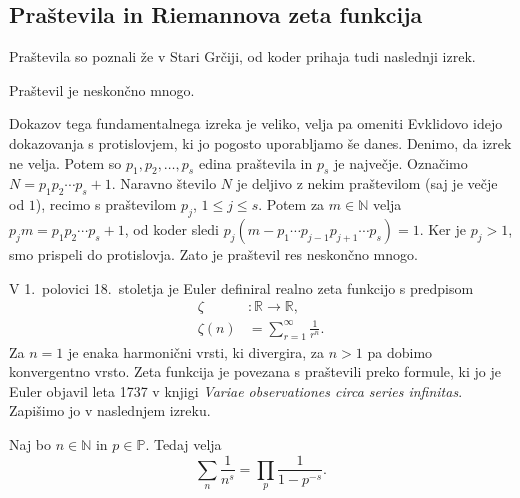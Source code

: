 \documentclass[mat1]{fmfdelo}
\begin{document}
\subsection{Praštevila in Riemannova zeta funkcija}

Praštevila so poznali že v Stari Grčiji, od koder prihaja tudi naslednji izrek.
\begin{izrek}[Evklid]
Praštevil je neskončno mnogo.
\end{izrek}

Dokazov tega fundamentalnega izreka je veliko, velja pa omeniti Evklidovo idejo dokazovanja s protislovjem, ki jo pogosto uporabljamo še danes. Denimo, da izrek ne velja. Potem so $p_1, p_2, \ldots, p_s$ edina praštevila in $p_s$ je največje. Označimo $N = p_1 p_2 \cdots p_s + 1$. Naravno število $N$ je deljivo z nekim praštevilom (saj je večje od $1$), recimo s praštevilom $p_j$, $1 \leq j \leq s$. Potem za $m \in \mathbb{N}$ velja $p_j m = p_1 p_2 \cdots p_s + 1$, od koder sledi $p_j (m - p_1 \cdots p_{j-1} p_{j+1} \cdots p_s) = 1$. Ker je $p_j > 1$, smo prispeli do protislovja. Zato je praštevil res neskončno mnogo.

V 1.~polovici 18.~stoletja je Euler definiral realno zeta funkcijo s predpisom
\begin{align}
\zeta &\colon \mathbb{R} \rightarrow \mathbb{R}, \nonumber \\
\zeta(n) &= \sum_{r=1}^{\infty}\frac{1}{r^n}.
\end{align}
Za $n=1$ je enaka harmonični vrsti, ki divergira, za $n>1$ pa dobimo konvergentno vrsto. Zeta funkcija je povezana s praštevili preko formule, ki jo je Euler objavil leta 1737 v knjigi \emph{Variae observationes circa series infinitas}. Zapišimo jo v naslednjem izreku.

\begin{izrek}
\label{izr:EulProdukt}
Naj bo $n\in\mathbb{N}$ in $p\in\mathbb{P}$. Tedaj velja
\begin{equation}
\sum_{n}\frac{1}{n^s} = \prod_{p}\frac{1}{1-p^{-s}}.
\end{equation}
\end{izrek}
\end{document}
